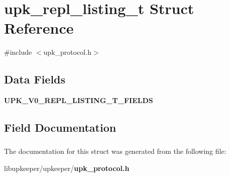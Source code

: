 \section{upk\_\-repl\_\-listing\_\-t Struct Reference}
\label{structupk__repl__listing__t}


{\ttfamily \#include $<$upk\_\-protocol.h$>$}

\subsection*{Data Fields}
\begin{DoxyCompactItemize}
\item 
{\bf UPK\_\-V0\_\-REPL\_\-LISTING\_\-T\_\-FIELDS}
\end{DoxyCompactItemize}


\subsection{Field Documentation}
\subsubsection[{UPK\_\-V0\_\-REPL\_\-LISTING\_\-T\_\-FIELDS}]{}\label{structupk__repl__listing__t_ad4640b0129723569038bf8ed05da0cd4}


The documentation for this struct was generated from the following file:\begin{DoxyCompactItemize}
\item 
libupkeeper/upkeeper/{\bf upk\_\-protocol.h}\end{DoxyCompactItemize}
